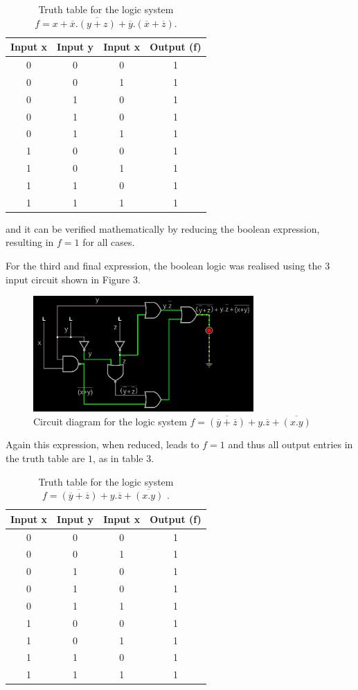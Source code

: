 \documentclass{article}
\newcommand{\ol}[1]{\overline{#1}}
\begin{document}
	\begin{table}[H]
	\centering
	\begin{tabular}{|c|c|c|c|}
		\hline
		Input x & Input y & Input x & Output (f)\\
		\hline 
		0 & 0 & 0 & 1\\
		0 & 0 & 1 & 1\\
		0 & 1 & 0 & 1\\
		0 & 1 & 0 & 1\\
		0 & 1 & 1 & 1\\
		1 & 0 & 0 & 1\\
		1 & 0 & 1 & 1\\
		1 & 1 & 0 & 1\\
		1 & 1 & 1 & 1\\
		\hline
	\end{tabular}
	\caption{Truth table for the logic system $ f = x + \ol{x}.\ol{(y+z)} +\ol{y}.(\ol{x} + \ol{z})$.}
\end{table}
 and it can be verified mathematically by reducing the boolean expression, resulting in $f=1$ for all cases.
 
 
For the third and final expression, the boolean logic was realised using the  3 input circuit shown in Figure 3.
 
 	\begin{figure}[H]
 	\centering
 	\includegraphics[width=0.75\textwidth]{three}
 	\caption{Circuit diagram for the logic system $f =\ol{(\ol{y} + \ol{z})} + y.\ol{z} +  \ol{(x.y)}$ }
 	\label{circuit3}
 \end{figure}

  Again this expression, when reduced, leads to $f=1$ and thus all output entries in the truth table are $1$, as in table 3.
 
\begin{table}[H]
	\centering
	\begin{tabular}{|c|c|c|c|}
		\hline
		Input x & Input y & Input x & Output (f)\\
		\hline
		0 & 0 & 0 & 1\\
		0 & 0 & 1 & 1\\
		0 & 1 & 0 & 1\\
		0 & 1 & 0 & 1\\
		0 & 1 & 1 & 1\\
		1 & 0 & 0 & 1\\
		1 & 0 & 1 & 1\\
		1 & 1 & 0 & 1\\
		1 & 1 & 1 & 1\\
		\hline
	\end{tabular}
	\caption{Truth table for the logic system $f =\ol{(\ol{y} + \ol{z})} + y.\ol{z} +  \ol{(x.y)}$ .}
\end{table}
\end{document}
